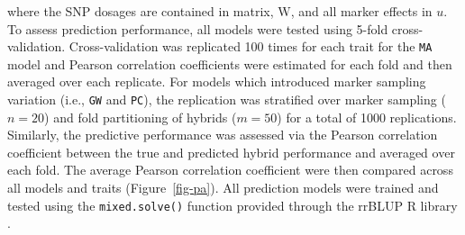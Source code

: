 \begin{refsection}
where the SNP dosages are contained in matrix, \(\mathrm{W}\), and all
marker effects in \(u\). To assess prediction performance, all models
were tested using 5-fold cross-validation. Cross-validation was
replicated 100 times for each trait for the \texttt{MA} model and
Pearson correlation coefficients were estimated for each fold and then
averaged over each replicate. For models which introduced marker
sampling variation (i.e., \texttt{GW} and \texttt{PC}), the replication
was stratified over marker sampling (\(n = 20\)) and fold partitioning
of hybrids (\(m = 50\)) for a total of 1000 replications. Similarly,
the predictive performance was assessed via the Pearson correlation
coefficient between the true and predicted hybrid performance and
averaged over each fold. The average Pearson correlation coefficient
were then compared across all models and traits (Figure~\ref{fig-pa}).
All prediction models were trained and tested using the
\texttt{mixed.solve()} function provided through the rrBLUP R library
\parencite{Endelman2011}.


\end{refsection}
